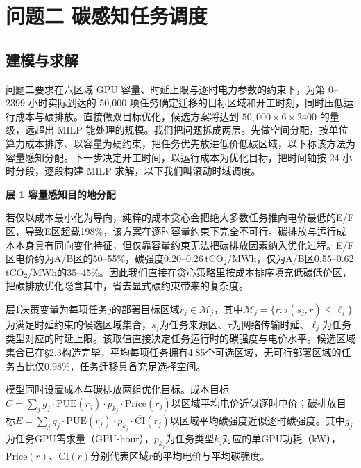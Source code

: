 
\section{问题二 碳感知任务调度}

\subsection{建模与求解}

问题二要求在六区域 GPU 容量、时延上限与逐时电力参数的约束下，为第 0--2399 小时实际到达的 50{,}000 项任务确定迁移的目标区域和开工时刻，同时压低运行成本与碳排放。直接做双目标优化，候选方案将达到 $50{,}000\times6\times2400$ 的量级，远超出 MILP 能处理的规模。我们把问题拆成两层。先做空间分配，按单位算力成本排序、以容量为硬约束，把任务优先放进低价低碳区域，以下称该方法为容量感知分配。下一步决定开工时间，以运行成本为优化目标，把时间轴按 24 小时分段，逐段构建 MILP 求解，以下我们叫滚动时域调度。

\medskip\noindent\textbf{层 1 \quad 容量感知目的地分配}\medskip

若仅以成本最小化为导向，纯粹的成本贪心会把绝大多数任务推向电价最低的E/F区，导致E区超载198\%，该方案在逐时容量约束下完全不可行。碳排放与运行成本本身具有同向变化特征，但仅靠容量约束无法把碳排放因素纳入优化过程。E/F区电价约为A/B区的50--55\%，碳强度0.20--0.26\,tCO$_2$/MWh，仅为A/B区0.55--0.62\,tCO$_2$/MWh的35--45\%。因此我们直接在贪心策略里按成本排序填充低碳低价区，把碳排放优化隐含其中，省去显式碳约束带来的复杂度。

层1决策变量为每项任务$j$的部署目标区域$r_j\in\mathcal{M}_j$，其中$\mathcal{M}_j=\{r:\tau(s_j,r)\le\ell_j\}$为满足时延约束的候选区域集合，$s_j$为任务来源区、$\tau$为网络传输时延、$\ell_j$为任务类型对应的时延上限。该取值直接决定任务运行时的碳强度与电价水平。候选区域集合已在§2.3构造完毕，平均每项任务拥有4.85个可选区域，无可行部署区域的任务占比仅0.98\%，任务迁移具备充足选择空间。

模型同时设置成本与碳排放两组优化目标。成本目标$C=\sum_j g_j\cdot\text{PUE}(r_j)\cdot p_{k_j}\cdot\overline{\text{Price}}(r_j)$以区域平均电价近似逐时电价；碳排放目标$E=\sum_j g_j\cdot\text{PUE}(r_j)\cdot p_{k_j}\cdot\overline{\text{CI}}(r_j)$以区域平均碳强度近似逐时碳强度。其中$g_j$为任务GPU需求量（GPU-hour），$p_{k_j}$为任务类型$k_j$对应的单GPU功耗（kW），$\overline{\text{Price}}(r)$、$\overline{\text{CI}}(r)$分别代表区域$r$的平均电价与平均碳强度。

